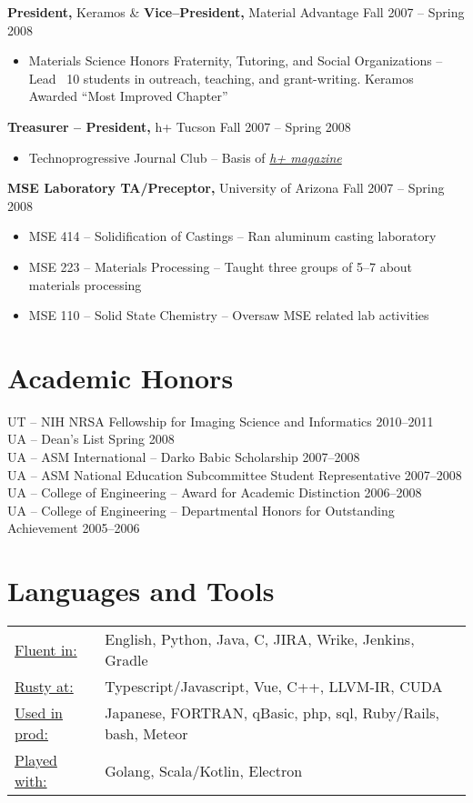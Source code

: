 \documentclass{res}
\begin{document}
\begin{resume}
{\bf President,} Keramos \& {\bf Vice--President,} Material Advantage \hfill Fall 2007 -- Spring 2008
\begin{itemize} \itemsep -2pt
  \item Materials Science Honors Fraternity, Tutoring, and Social Organizations -- Lead ~10 students in outreach,
    teaching, and grant-writing. Keramos Awarded ``Most Improved Chapter''
\end{itemize}

{\bf Treasurer -- President,} h+ Tucson \hfill Fall 2007 -- Spring 2008
\begin{itemize} \itemsep -2pt
  \item Technoprogressive Journal Club -- Basis of \href{http://hplusmagazine.com/}{\textit{h+ magazine}}
\end{itemize}

{\bf MSE Laboratory TA/Preceptor,} University of Arizona \hfill Fall 2007 -- Spring 2008
\begin{itemize} \itemsep -2pt
  \item MSE 414 -- Solidification of Castings -- Ran aluminum casting laboratory
  \item MSE 223 -- Materials Processing -- Taught three groups of 5--7 about materials processing
  \item MSE 110 -- Solid State Chemistry -- Oversaw MSE related lab activities
\end{itemize}

\section{Academic Honors}
UT -- NIH NRSA Fellowship for Imaging Science and Informatics \hfill 2010--2011\\
UA -- Dean’s List \hfill Spring 2008 \\
UA -- ASM International -- Darko Babic Scholarship \hfill 2007--2008 \\
UA -- ASM National Education Subcommittee Student Representative \hfill 2007--2008 \\
UA -- College of Engineering -- Award for Academic Distinction \hfill 2006--2008 \\
UA -- College of Engineering -- Departmental Honors for Outstanding Achievement \hfill 2005--2006

\section{Languages and Tools}
 \begin{tabular}{l p{5.5in}}
   \underline{Fluent in:}    & English, Python, Java, C, JIRA, Wrike, Jenkins, Gradle \\
   \underline{Rusty at:}     & Typescript/Javascript, Vue, C++, LLVM-IR, CUDA \\
   \underline{Used in prod:} & Japanese, FORTRAN, qBasic, php, sql, Ruby/Rails, bash, Meteor \\
   \underline{Played with:}  & Golang, Scala/Kotlin, Electron
 \end{tabular}


\end{resume}
\end{document}

